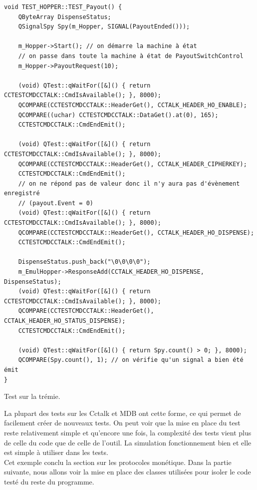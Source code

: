 \documentclass[a4paper]{article}
\begin{document}
\begin{listing}[ht!]
\begin{verbatim}
void TEST_HOPPER::TEST_Payout() {
    QByteArray DispenseStatus;
    QSignalSpy Spy(m_Hopper, SIGNAL(PayoutEnded()));

    m_Hopper->Start(); // on démarre la machine à état
    // on passe dans toute la machine à état de PayoutSwitchControl
    m_Hopper->PayoutRequest(10);

    (void) QTest::qWaitFor([&]() { return CCTESTCMDCCTALK::CmdIsAvailable(); }, 8000);
    QCOMPARE(CCTESTCMDCCTALK::HeaderGet(), CCTALK_HEADER_HO_ENABLE);
    QCOMPARE((uchar) CCTESTCMDCCTALK::DataGet().at(0), 165);
    CCTESTCMDCCTALK::CmdEndEmit();

    (void) QTest::qWaitFor([&]() { return CCTESTCMDCCTALK::CmdIsAvailable(); }, 8000);
    QCOMPARE(CCTESTCMDCCTALK::HeaderGet(), CCTALK_HEADER_CIPHERKEY);
    CCTESTCMDCCTALK::CmdEndEmit();
    // on ne répond pas de valeur donc il n'y aura pas d'évènement enregistré
    // (payout.Event = 0)
    (void) QTest::qWaitFor([&]() { return CCTESTCMDCCTALK::CmdIsAvailable(); }, 8000);
    QCOMPARE(CCTESTCMDCCTALK::HeaderGet(), CCTALK_HEADER_HO_DISPENSE);
    CCTESTCMDCCTALK::CmdEndEmit();

    DispenseStatus.push_back("\0\0\0\0");
    m_EmulHopper->ResponseAdd(CCTALK_HEADER_HO_DISPENSE, DispenseStatus);
    (void) QTest::qWaitFor([&]() { return CCTESTCMDCCTALK::CmdIsAvailable(); }, 8000);
    QCOMPARE(CCTESTCMDCCTALK::HeaderGet(), CCTALK_HEADER_HO_STATUS_DISPENSE);
    CCTESTCMDCCTALK::CmdEndEmit();

    (void) QTest::qWaitFor([&]() { return Spy.count() > 0; }, 8000);
    QCOMPARE(Spy.count(), 1); // on vérifie qu'un signal a bien été émit
}
\end{verbatim}
\caption{Test sur la trémie.}
\label{testhopper}
\end{listing}
\pagebreak

La plupart des tests sur les Cctalk et MDB ont cette forme, ce qui permet de
facilement créer de nouveaux tests. On peut voir que la mise en place du test
reste relativement simple et qu'encore une fois, la complexité des tests vient
plus de celle du code que de celle de l'outil. La simulation fonctionnement bien
et elle est simple à utiliser dans les tests.\\

Cet exemple conclu la section sur les protocoles monétique. Dans la partie
suivante, nous allons voir la mise en place des classes utilisées pour isoler le
code testé du reste du programme.
\end{document}

